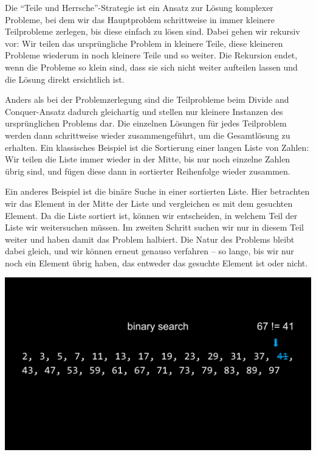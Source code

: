 \documentclass[
  ngerman,
  letterpaper,
  DIV=11]{scrreprt}
\begin{document}
Die ``Teile und Herrsche''-Strategie ist ein Ansatz zur Lösung komplexer
Probleme, bei dem wir das Hauptproblem schrittweise in immer kleinere
Teilprobleme zerlegen, bis diese einfach zu lösen sind. Dabei gehen wir
rekursiv vor: Wir teilen das ursprüngliche Problem in kleinere Teile,
diese kleineren Probleme wiederum in noch kleinere Teile und so weiter.
Die Rekursion endet, wenn die Probleme so klein sind, dass sie sich
nicht weiter aufteilen lassen und die Lösung direkt ersichtlich ist.

Anders als bei der Problemzerlegung sind die Teilprobleme beim Divide
and Conquer-Ansatz dadurch gleichartig und stellen nur kleinere
Instanzen des ursprünglichen Problems dar. Die einzelnen Lösungen für
jedes Teilproblem werden dann schrittweise wieder zusammengeführt, um
die Gesamtlösung zu erhalten. Ein klassisches Beispiel ist die
Sortierung einer langen Liste von Zahlen: Wir teilen die Liste immer
wieder in der Mitte, bis nur noch einzelne Zahlen übrig sind, und fügen
diese dann in sortierter Reihenfolge wieder zusammen.

Ein anderes Beispiel ist die binäre Suche in einer sortierten Liste.
Hier betrachten wir das Element in der Mitte der Liste und vergleichen
es mit dem gesuchten Element. Da die Liste sortiert ist, können wir
entscheiden, in welchem Teil der Liste wir weitersuchen müssen. Im
zweiten Schritt suchen wir nur in diesem Teil weiter und haben damit das
Problem halbiert. Die Natur des Problems bleibt dabei gleich, und wir
können erneut genauso verfahren -- so lange, bis wir nur noch ein
Element übrig haben, das entweder das gesuchte Element ist oder nicht.

\begin{center}
\includegraphics[width=1\linewidth,height=\textheight,keepaspectratio]{problem-solving_files/mediabag/problem_solving_67_p.png}
\end{center}
\end{document}
